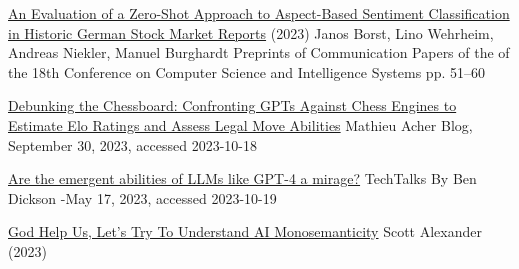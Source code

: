 \documentclass[25pt,a4paper,landscape,headrule,footrule,xetex]{foils}
\let\oldbibliography
\renewcommand{}[1]{
  \begingroup
  \renewcommand{\section}[2]{} %
  \oldbibliography{#1} %
  \endgroup
}
\begin{document}
\href{https://annals-csis.org/proceedings/2023/pliks/3725.pdf}{An Evaluation of a Zero-Shot Approach to
Aspect-Based Sentiment Classification in Historic
German Stock Market Reports} (2023) Janos Borst, Lino Wehrheim, Andreas Niekler, Manuel Burghardt
Preprints of Communication Papers of the of the 18th Conference on Computer
Science and Intelligence Systems pp. 51–60

\href{https://blog.mathieuacher.com/GPTsChessEloRatingLegalMoves/}{Debunking the Chessboard: Confronting GPTs Against Chess Engines to Estimate Elo Ratings and Assess Legal Move Abilities} 
Mathieu Acher Blog, September 30, 2023, accessed 2023-10-18

\href{https://bdtechtalks.com/2023/05/17/llm-emergent-abilities-mirage/}{Are the emergent abilities of LLMs like GPT-4 a mirage?} TechTalks
By Ben Dickson -May 17, 2023, accessed 2023-10-19

\href{https://www.astralcodexten.com/p/god-help-us-lets-try-to-understand}{God Help Us, Let's Try To Understand AI Monosemanticity} Scott Alexander (2023)






\end{document}
